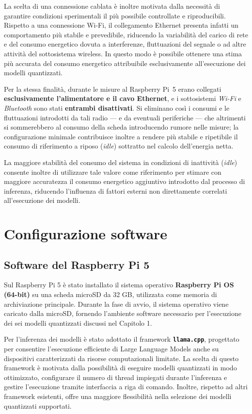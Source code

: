 La scelta di una connessione cablata è inoltre motivata dalla necessità di
garantire condizioni sperimentali il più possibile controllate e riproducibili.
Rispetto a una connessione Wi-Fi, il collegamento Ethernet presenta infatti un
comportamento più stabile e prevedibile, riducendo la variabilità del carico di
rete e del consumo energetico dovuta a interferenze, fluttuazioni del segnale o
ad altre attività del sottosistema wireless. In questo modo è possibile ottenere
una stima più accurata del consumo energetico attribuibile esclusivamente
all'esecuzione dei modelli quantizzati.

Per la stessa finalità, durante le misure al Raspberry Pi~5 erano collegati
\textbf{esclusivamente l'alimentatore e il cavo Ethernet}, e i sottosistemi
\textit{Wi-Fi} e \textit{Bluetooth} sono stati \textbf{entrambi disattivati}. Si
eliminano così i consumi e le fluttuazioni introdotti da tali radio --- e da
eventuali periferiche --- che altrimenti si sommerebbero al consumo della scheda
introducendo rumore nelle misure; la configurazione minimale contribuisce inoltre a
rendere più stabile e ripetibile il consumo di riferimento a riposo (\textit{idle})
sottratto nel calcolo dell'energia netta.

La maggiore stabilità del consumo del sistema in condizioni di inattività
(\textit{idle}) consente inoltre di utilizzare tale valore come riferimento per
stimare con maggiore accuratezza il consumo energetico aggiuntivo introdotto dal
processo di inferenza, riducendo l'influenza di fattori esterni non direttamente
correlati all'esecuzione dei modelli.

\section{Configurazione software}

\subsection{Software del Raspberry Pi 5}

Sul Raspberry Pi 5 è stato installato il sistema operativo \textbf{Raspberry Pi OS (64-bit)}
su una scheda microSD da 32 GB, utilizzata come memoria di archiviazione principale.
Durante la fase di avvio, il sistema operativo viene caricato dalla microSD, fornendo
l'ambiente software necessario per l'esecuzione dei sei modelli quantizzati discussi
nel Capitolo 1.

Per l'inferenza dei modelli è stato adottato il framework \textbf{\texttt{llama.cpp}},
progettato per consentire l'esecuzione efficiente di Large Language Models anche su dispositivi
caratterizzati da risorse computazionali limitate. La scelta di questo framework è motivata
dalla possibilità di eseguire modelli quantizzati in modo ottimizzato, configurare il numero
di thread impiegati durante l'inferenza e gestire l'esecuzione tramite interfaccia a riga di comando.
Inoltre, rispetto ad altri framework esistenti, offre una maggiore flessibilità nella selezione dei modelli
quantizzati supportati.

